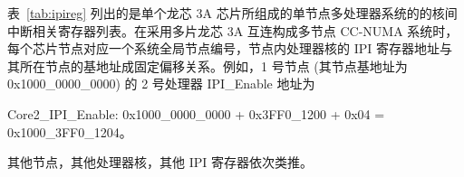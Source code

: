 表~\ref{tab:ipireg} 列出的是单个龙芯 3A
芯片所组成的单节点多处理器系统的的核间中断相关寄存器列表。在采用多片龙芯 3A
互连构成多节点 CC-NUMA
系统时，每个芯片节点对应一个系统全局节点编号，节点内处理器核的 IPI
寄存器地址与其所在节点的基地址成固定偏移关系。例如，1 号节点
(其节点基地址为0x1000\_0000\_0000) 的 2 号处理器 IPI\_Enable 地址为
\begin{center}
  Core2\_IPI\_Enable: 0x1000\_0000\_0000 + 0x3FF0\_1200 + 0x04 = 0x1000\_3FF0\_1204。
\end{center}
其他节点，其他处理器核，其他 IPI 寄存器依次类推。


